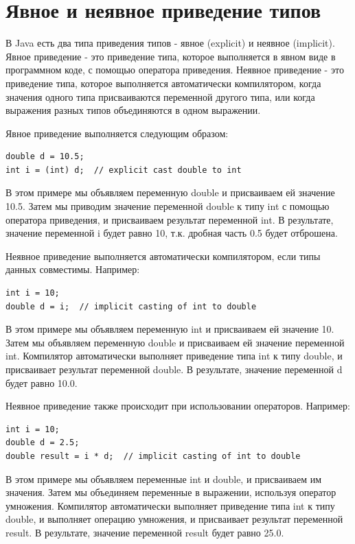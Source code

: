\section{Явное и неявное приведение типов}

В Java есть два типа приведения типов - явное (explicit) и неявное (implicit). Явное приведение - это приведение типа, которое выполняется в явном виде в программном коде, с помощью оператора приведения. Неявное приведение - это приведение типа, которое выполняется автоматически компилятором, когда значения одного типа присваиваются переменной другого типа, или когда выражения разных типов объединяются в одном выражении.

Явное приведение выполняется следующим образом:

\begin{lstlisting}
double d = 10.5;
int i = (int) d;  // explicit cast double to int
\end{lstlisting}

В этом примере мы объявляем переменную double и присваиваем ей значение 10.5. Затем мы приводим значение переменной double к типу int с помощью оператора приведения, и присваиваем результат переменной int. В результате, значение переменной i будет равно 10, т.к. дробная часть 0.5 будет отброшена.

Неявное приведение выполняется автоматически компилятором, если типы данных совместимы. Например:

\begin{lstlisting}
int i = 10;
double d = i;  // implicit casting of int to double
\end{lstlisting}

В этом примере мы объявляем переменную int и присваиваем ей значение 10. Затем мы объявляем переменную double и присваиваем ей значение переменной int. Компилятор автоматически выполняет приведение типа int к типу double, и присваивает результат переменной double. В результате, значение переменной d будет равно 10.0.

Неявное приведение также происходит при использовании операторов. Например:

\begin{lstlisting}
int i = 10;
double d = 2.5;
double result = i * d;  // implicit casting of int to double
\end{lstlisting}

В этом примере мы объявляем переменные int и double, и присваиваем им значения. Затем мы объединяем переменные в выражении, используя оператор умножения. Компилятор автоматически выполняет приведение типа int к типу double, и выполняет операцию умножения, и присваивает результат переменной result. В результате, значение переменной result будет равно 25.0.

